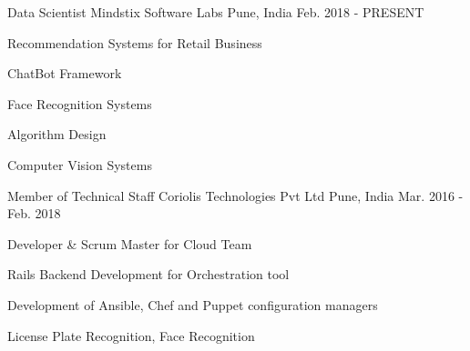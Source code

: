 

\begin{cventries}


  \cventry
    {Data Scientist} %
    {Mindstix Software Labs} %
    {Pune, India} %
    {Feb. 2018 - PRESENT} %
    {
      \begin{cvitems} %
        \item {Recommendation Systems for Retail Business}
        \item {ChatBot Framework}
        \item {Face Recognition Systems}
        \item {Algorithm Design}
        \item {Computer Vision Systems}
      \end{cvitems}
    }

    \cventry
    {Member of Technical Staff} %
    {Coriolis Technologies Pvt Ltd} %
    {Pune, India} %
    {Mar. 2016 - Feb. 2018} %
    {
      \begin{cvitems} %
        \item {Developer \& Scrum Master for  Cloud Team}
        \item {Rails Backend Development for Orchestration tool}
        \item {Development of Ansible, Chef and Puppet configuration managers}
        \item {License Plate Recognition, Face Recognition }
      \end{cvitems}
    }


\end{cventries}
